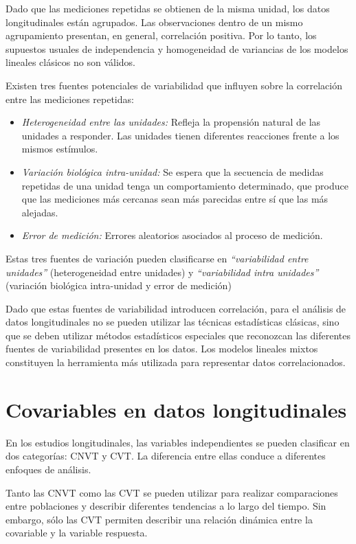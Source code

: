 \documentclass[spanish]{article}
\numberwithin{figure}{subsection}
\numberwithin{equation}{subsection}
\numberwithin{table}{subsection}
\begin{document}
Dado que las mediciones repetidas se obtienen de la misma unidad, los datos
longitudinales están agrupados. Las observaciones dentro de un mismo
agrupamiento presentan, en general, correlación positiva. Por lo tanto, los
supuestos usuales de independencia y homogeneidad de variancias de los modelos
lineales clásicos no son válidos.

Existen tres fuentes potenciales de variabilidad que influyen sobre la
correlación entre las mediciones repetidas:

\begin{itemize}
	\item \textit{Heterogeneidad entre las unidades:} Refleja la propensión
	natural de las unidades a responder. Las unidades tienen diferentes
	reacciones frente a los mismos estímulos.
	\item \textit{Variación biológica intra-unidad:} Se espera que la secuencia
	de medidas repetidas de una unidad tenga un comportamiento determinado, que
	produce que las mediciones más cercanas sean más parecidas entre sí que las
	más alejadas.
	\item \textit{Error de medición:} Errores aleatorios asociados al proceso de
	medición.
\end{itemize}

Estas tres fuentes de variación pueden clasificarse en \textit{``variabilidad
entre unidades''} (heterogeneidad entre unidades) y \textit{``variabilidad
intra unidades''} (variación biológica intra-unidad y error de medición)

Dado que estas fuentes de variabilidad introducen correlación, para el análisis
de datos longitudinales no se pueden utilizar las técnicas estadísticas
clásicas, sino que se deben utilizar métodos estadísticos especiales que
reconozcan las diferentes fuentes de variabilidad presentes en los datos. Los
modelos lineales mixtos constituyen la herramienta más utilizada para
representar datos correlacionados.

\section{Covariables en datos longitudinales}

En los estudios longitudinales, las variables independientes se pueden
clasificar en dos categorías: CNVT y CVT. La diferencia entre ellas conduce a
diferentes enfoques de análisis.

Tanto las CNVT como las CVT se pueden utilizar para realizar comparaciones entre
poblaciones y describir diferentes tendencias a lo largo del tiempo. Sin
embargo, sólo las CVT permiten describir una relación dinámica entre la
covariable y la variable respuesta.
\end{document}
